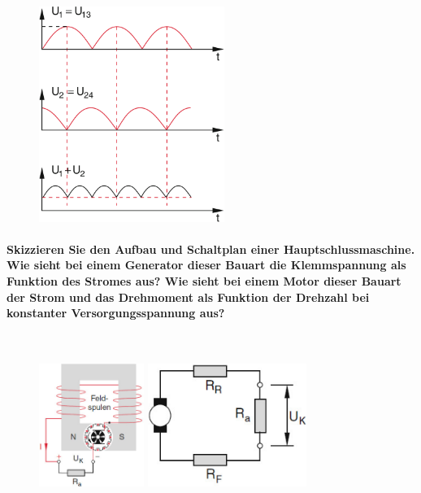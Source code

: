 \documentclass[a4paper, 11pt, parskip=half]{scrartcl}
\begin{document}
\begin{figure}[H]
    \centering
    \includegraphics[height=7cm]{image/8/2.3}
\end{figure}

\paragraph{Skizzieren Sie den Aufbau und Schaltplan einer Hauptschlussmaschine. Wie sieht bei einem
Generator dieser Bauart die Klemmspannung als Funktion des Stromes aus? Wie sieht bei einem Motor
dieser Bauart der Strom und das Drehmoment als Funktion der Drehzahl bei konstanter
Versorgungsspannung aus?} ~

\begin{figure}[H]
    \centering
    \begin{minipage}[b]{0.3\textwidth}
        \centering
        \includegraphics[height=4cm]{image/8/3.1}
    \end{minipage}
    \hspace{2cm}
    \begin{minipage}[b]{0.3\textwidth}
        \centering
        \includegraphics[height=4cm]{image/8/3.2}
    \end{minipage}
\end{figure}
\end{document}
